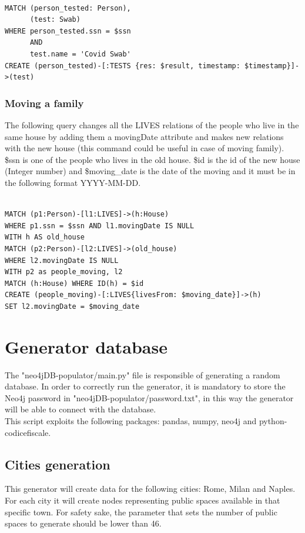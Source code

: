 \documentclass{article}
\begin{document}
\begin{lstlisting}[language=cypher, label=lst:cypher-example]

MATCH (person_tested: Person),
      (test: Swab)
WHERE person_tested.ssn = $ssn
      AND
      test.name = 'Covid Swab'
CREATE (person_tested)-[:TESTS {res: $result, timestamp: $timestamp}]->(test)

\end{lstlisting}
\subsubsection{Moving a family}
The following query changes all the LIVES relations of the people who live in the same house by adding them a movingDate attribute and makes new relations with the new house (this command could be useful in case of moving family).
\$ssn is one of the people who lives in the old house. \$id is the id of the new house (Integer number) and \$moving\_date is the date of the moving and it must be in the following format YYYY-MM-DD.


\begin{lstlisting}[language=cypher, label=lst:cypher-example]

MATCH (p1:Person)-[l1:LIVES]->(h:House)
WHERE p1.ssn = $ssn AND l1.movingDate IS NULL
WITH h AS old_house
MATCH (p2:Person)-[l2:LIVES]->(old_house)
WHERE l2.movingDate IS NULL
WITH p2 as people_moving, l2
MATCH (h:House) WHERE ID(h) = $id
CREATE (people_moving)-[:LIVES{livesFrom: $moving_date}]->(h)
SET l2.movingDate = $moving_date

\end{lstlisting}

\newpage
\section{Generator database}
The {\selectfont"neo4jDB-populator/main.py"} file is responsible of generating a random database.
In order to correctly run the generator, it is mandatory to store the Neo4j password in {\selectfont"neo4jDB-populator/password.txt"}, in this way the generator will be able to connect with the database.
\\This script exploits the following packages: {\selectfont pandas, numpy, neo4j and python-codicefiscale}.

\subsection{Cities generation}
This generator will create data for the following cities: Rome, Milan and Naples. For each city it will create nodes representing public spaces available in that specific town. For safety sake, the parameter that sets the number of public spaces to generate should be lower than 46.
\end{document}
